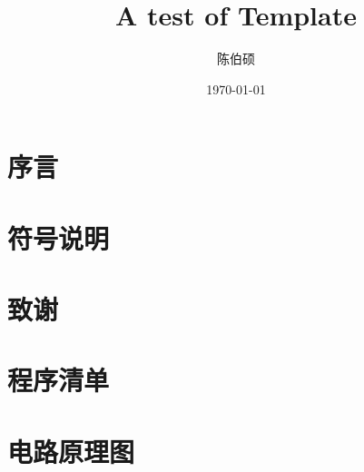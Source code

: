 \documentclass[draft]{XaufeThesisTemplate}
\title{A test of Template}
\author{陈伯硕}
\date{\today}
\begin{document}




\listoftodos



% 

\setcounter{tocdepth}{3}
\tableofcontents
\newpage

\setcounter{page}{1}

\section*{序言}
	
\section{符号说明}
	

\section*{致谢}
	


\nocite{*}

\begin{appendices} %
  \section{程序清单}
  \section{电路原理图}
\end{appendices}
\end{document}
